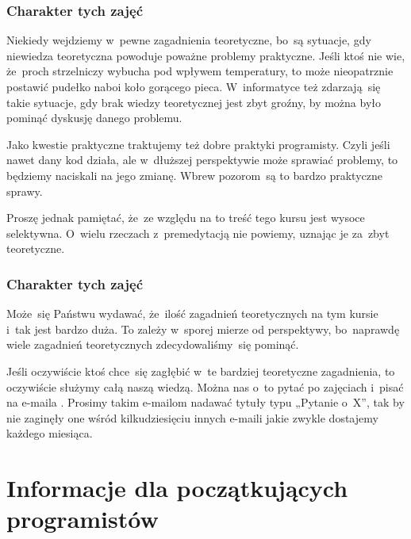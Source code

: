 \documentclass[10pt,t]{beamer}
\begin{document}
\begin{frame}
  \frametitle{Charakter tych zajęć}


  Niekiedy wejdziemy w~pewne zagadnienia teoretyczne, bo~są sytuacje, gdy
  niewiedza teoretyczna powoduje poważne problemy praktyczne. Jeśli ktoś
  nie wie, że~proch strzelniczy wybucha pod wpływem temperatury, to może
  nieopatrznie postawić pudełko naboi koło gorącego pieca. W~informatyce
  też zdarzają~się takie sytuacje, gdy brak wiedzy teoretycznej jest zbyt
  groźny, by można było pominąć dyskusję danego problemu.

  Jako kwestie praktyczne traktujemy też dobre praktyki programisty.
  Czyli jeśli nawet dany kod działa, ale w~dłuższej perspektywie może
  sprawiać problemy, to będziemy naciskali na jego zmianę. Wbrew
  pozorom~są to bardzo praktyczne sprawy.

  Proszę jednak pamiętać, że~ze względu na to treść tego kursu jest wysoce
  selektywna. O~wielu rzeczach z~premedytacją nie powiemy, uznając je
  za~zbyt teoretyczne.

\end{frame}





\begin{frame}
  \frametitle{Charakter tych zajęć}


  Może~się Państwu wydawać, że~ilość zagadnień teoretycznych na tym kursie
  i~tak jest bardzo duża. To zależy w~sporej mierze od perspektywy,
  bo~naprawdę wiele zagadnień teoretycznych zdecydowaliśmy~się pominąć.

  Jeśli oczywiście ktoś chce~się zagłębić w~te bardziej teoretyczne
  zagadnienia, to oczywiście służymy całą naszą wiedzą. Można
  nas o~to pytać po zajęciach i~pisać na e-maila \email.
  Prosimy takim e-mailom nadawać tytuły typu „Pytanie o~X”, tak by nie
  zaginęły one wśród kilkudziesięciu innych e-maili jakie zwykle dostajemy
  każdego miesiąca.

\end{frame}










\section{Informacje dla początkujących programistów}
\end{document}
